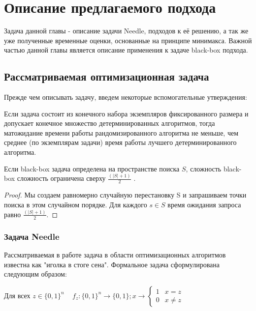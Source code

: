 \chapter{Описание предлагаемого подхода}
\label{chapter2}

Задача данной главы - описание задачи Needle, подходов к её решению, а так же уже полученные временные оценки, основанные на принципе минимакса. Важной частью данной главы является описание применения к задаче black-box подхода.

\section{Рассматриваемая оптимизационная задача}

Прежде чем описывать задачу, введем некоторые вспомогательные утверждения:

\begin{prop}
Если задача состоит из конечного набора экземпляров фиксированного размера и допускает конечное множество детерминированных алгоритмов, тогда матожидание времени работы рандомизированного алгоритма не меньше, чем среднее (по экземплярам задачи) время работы лучшего детерминированного алгоритма.
\end{prop}


\begin{prop}
Если black-box задача определена на пространстве поиска $S$, сложность black-box сложность ограничена сверху $ \frac{(| S | + 1)}{2}$ \cite{2}.
\end{prop}



\begin{proof}
    Мы создаем равномерно случайную перестановку S и запрашиваем точки поиска в этом случайном порядке. Для каждого $s \in S$ время ожидания запроса равно  $ \frac{(| S | + 1)}{2}$.
\end{proof}


\subsection{Задача Needle}
Рассматриваемая в работе задача в области оптимизационных алгоритмов известна как "иголка в стоге сена". Формальное задача сформулирована следующим образом: 

Для всех $z \in \{0, 1\}^n \;\;\; $  
    \begin{math} 
    f_{z} : \{0, 1 \}^n \rightarrow \{0,1\}; x \rightarrow  \left\{ \begin{array}{ll}
    1 & \textrm{$x = z$}\\
    0 & \textrm{$x \ne z$}
    \end{array} \right.
    \end{math}

